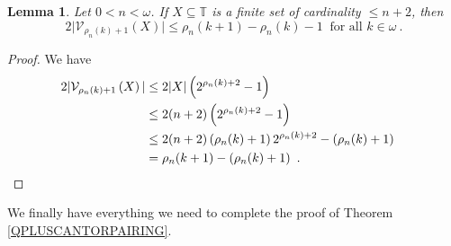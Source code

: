 \documentclass[10pt,a4paper, openany,  oldfontcommands]{memoir}
\newtheorem{lemma} [theorem] {Lemma}
\newtheorem{open problem} [theorem] {Open Problem}
\newtheorem{open question} [theorem] {Open Question}
\begin{document}
\begin{lemma}   %
Let  $  0 <  n  <   \omega   $.
If   $X  \subseteq   \mathbb{T} $  is  a  finite set of cardinality $  \leq  n +2  $,  then 
\[
2 \vert   \mathcal{V}_{  \rho_n ( k ) +1   }        \left(   X\right)    \vert   \leq    \rho_n (k+1)   -   \rho_n ( k )  - 1  
\   \mbox{  for  all }  k  \in  \omega   
\      .
\]
\end{lemma}
\begin{proof}

We have  
\begin{align*}
2  \vert     \mathcal{V}_{  \rho_n ( k ) +1   }     \left(   X  \right)    \vert  
&  \leq  2    \vert   X  \vert       \left(  2^{   \rho_n ( k ) +2} - 1 \right)  
  \\
    &  \leq  2  (n+2)       \left(  2^{   \rho_n ( k ) +2} - 1 \right)  
  \\
  &  \leq  2   (n+2)          \left(   \rho_n ( k ) +1       \right)     2^{   \rho_n ( k ) +2}   -  \left(   \rho_n (k) + 1  \right) 
  \\
  &   =        \rho_n ( k+1 )    -  \left(   \rho_n (k) + 1  \right) 
\        .    & \qedhere
\end{align*}

\end{proof}


















We finally have everything we need to complete the proof of   Theorem  \ref{QPLUSCANTORPAIRING}. 
\end{document}
